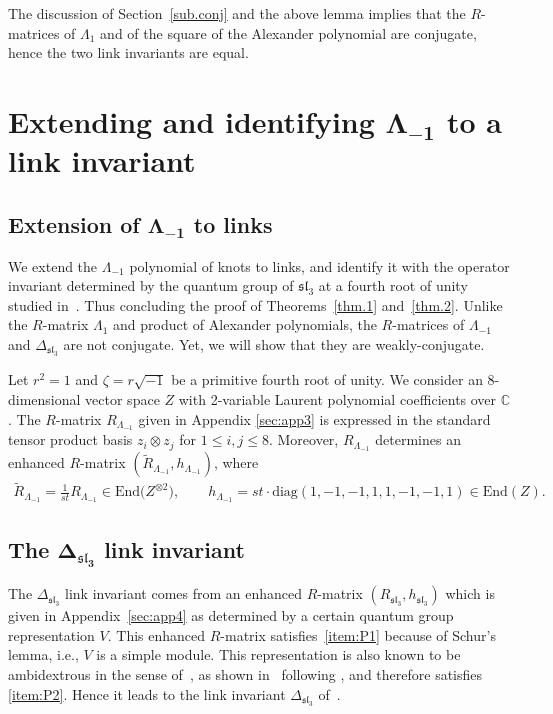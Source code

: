 \documentclass[pdftex]{sigma}
\numberwithin{equation}{section}
\theoremstyle{definition}
\begin{document}
The discussion of Section~\ref{sub.conj} and the above lemma
implies that the $R$-matrices of $\Lambda_1$ and of the square of the Alexander
polynomial are conjugate, hence the two link invariants are equal.

\section[Extending and identifying Lambda\_\{-1\} to a link invariant]{Extending and identifying $\boldsymbol{\Lambda_{-1}}$ to a link invariant}
\label{sec:Lm1}

\subsection[Extension of Lambda\_\{-1\} to links]{Extension of $\boldsymbol{\Lambda_{-1}}$ to links}

We extend the $\Lambda_{-1}$ polynomial of knots to links, and identify it with the
operator invariant determined by the quantum group of $\mathfrak{sl}_3$ at a fourth root
of unity studied in~\cite{Harper}. Thus
concluding the proof of Theorems~\ref{thm.1} and~\ref{thm.2}.
Unlike the $R$-matrix $\Lambda_1$ and product of Alexander polynomials, the
$R$-matrices of $\Lambda_{-1}$ and $\Delta_{\mathfrak{sl}_3}$ are not conjugate. Yet, we
will show that they are weakly-conjugate.

Let $r^2=1$ and $\zeta=r\sqrt{-1}$ be a primitive fourth root of unity. We consider
an 8-dimensional vector space $Z$ with 2-variable Laurent polynomial coefficients
over $\mathbb{C}$. The $R$-matrix $R_{\Lambda_{-1}}$ given in Appendix \ref{sec:app3} is
expressed in the standard tensor product basis $z_i\otimes z_j$ for $1\leq i,j\leq 8$.
Moreover, $R_{\Lambda_{-1}}$ determines an enhanced $R$-matrix
$(\tilde{R}_{\Lambda_{-1}},h_{\Lambda_{-1}})$, where
\begin{gather*}
\tilde{R}_{\Lambda_{-1}}=\frac{1}{st}R_{\Lambda_{-1}}\in\mathrm{End}\bigl(Z^{\otimes 2}\bigr),\qquad
h_{\Lambda_{-1}}=st \cdot\mathrm{diag}(1,-1,-1,1,1,-1,-1,1) \in \mathrm{End}(Z) .
\end{gather*}

\subsection[The Delta\_\{sl\_3\} link invariant]{The $\boldsymbol{\Delta_{\mathfrak{sl}_3}}$ link invariant}

The $\Delta_{\mathfrak{sl}_3}$ link invariant comes from an enhanced $R$-matrix
$(R_{\mathfrak{sl}_3},h_{\mathfrak{sl}_3})$ which is given in Appendix~\ref{sec:app4} as determined
by a certain quantum group representation $V$.
This enhanced $R$-matrix satisfies~\eqref{item:P1} because of Schur's lemma, i.e.,
$V$ is a simple module. This representation is also known to be ambidextrous in the
sense of~\cite{GPT}, as shown in~\cite{Harper} following \cite{GP13}, and therefore
satisfies \eqref{item:P2}. Hence it leads to the link invariant $\Delta_{\mathfrak{sl}_3}$
of~\cite{Harper}.
\end{document}
